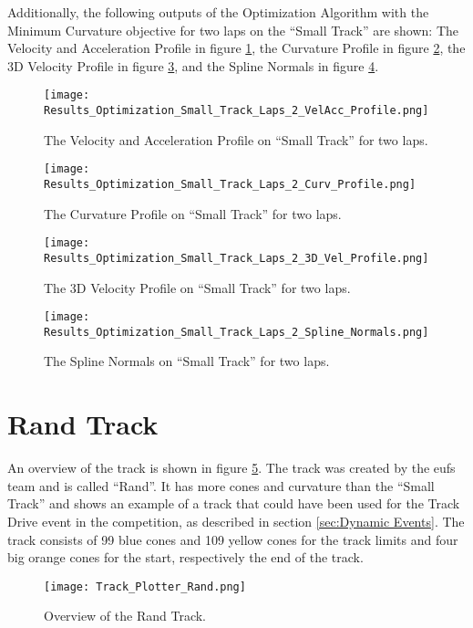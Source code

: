 Additionally, the following outputs of the Optimization Algorithm with the Minimum Curvature objective for two laps on the ``Small Track'' are shown: The Velocity and Acceleration Profile in figure \ref{fig:Results Small Track Laps 2 VelAcc Profile}, the Curvature Profile in figure \ref{fig:Results Small Track Laps 2 Curv Profile}, the 3D Velocity Profile in figure \ref{fig:Results Small Track Laps 2 3D Vel Profile}, and the Spline Normals in figure \ref{fig:Results Small Track Laps 2 Spline Normals}.
\begin{figure}[H]
    \centering
    \texttt{[image: Results\_Optimization\_Small\_Track\_Laps\_2\_VelAcc\_Profile.png]}
    \caption{The Velocity and Acceleration Profile on ``Small Track'' for two laps.}
    \label{fig:Results Small Track Laps 2 VelAcc Profile}
\end{figure}
\begin{figure}[H]
    \centering
    \texttt{[image: Results\_Optimization\_Small\_Track\_Laps\_2\_Curv\_Profile.png]}
    \caption{The Curvature Profile on ``Small Track'' for two laps.}
    \label{fig:Results Small Track Laps 2 Curv Profile}
\end{figure}
\begin{figure}[H]
    \centering
    \texttt{[image: Results\_Optimization\_Small\_Track\_Laps\_2\_3D\_Vel\_Profile.png]}
    \caption{The 3D Velocity Profile on ``Small Track'' for two laps.}
    \label{fig:Results Small Track Laps 2 3D Vel Profile}
\end{figure}
\begin{figure}[H]
    \centering
    \texttt{[image: Results\_Optimization\_Small\_Track\_Laps\_2\_Spline\_Normals.png]}
    \caption{The Spline Normals on ``Small Track'' for two laps.}
    \label{fig:Results Small Track Laps 2 Spline Normals}
\end{figure}

\pagebreak

\section{Rand Track} \label{sec:Results Rand Track}
An overview of the track is shown in figure \ref{fig:Results Rand Initial}. The track was created by the \acrshort{eufs} team and is called ``Rand''. \cite{eufs_sim_gitlab} It has more cones and curvature than the ``Small Track'' and shows an example of a track that could have been used for the Track Drive event in the competition, as described in section \ref{sec:Dynamic Events}. The track consists of 99 blue cones and 109 yellow cones for the track limits and four big orange cones for the start, respectively the end of the track.
\begin{figure}[H]
    \centering
    \texttt{[image: Track\_Plotter\_Rand.png]}
    \caption{Overview of the Rand Track.}
    \label{fig:Results Rand Initial}
\end{figure}


